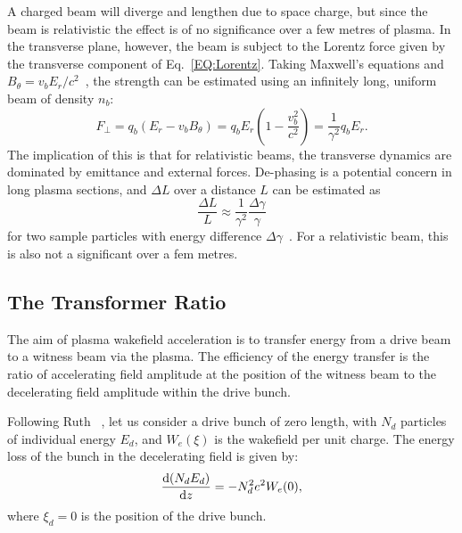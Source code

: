 A charged beam will diverge and lengthen due to space charge, but since the beam is relativistic the effect is of no significance over a few metres of plasma. In the transverse plane, however, the beam is subject to the Lorentz force given by the transverse component of Eq.~\ref{EQ:Lorentz}. Taking Maxwell's equations and $B_{\theta} = v_{b}E_{r}/c^{2}$~\cite{schindl:1999}, the strength can be estimated using an infinitely long, uniform beam of density $n_{b}$:
\begin{equation}
    F_{\perp} = q_{b}(E_{r} - v_{b}B_{\theta})
              = q_{b}E_{r}\left(1 - \frac{v_{b}^{2}}{c^{2}}\right)
              = \frac{1}{\gamma^2}q_{b}E_{r}. \label{EQ:DeFocR}
\end{equation}
The implication of this is that for relativistic beams, the transverse dynamics are dominated by emittance and external forces. De-phasing is a potential concern in long plasma sections, and $\Delta L$ over a distance $L$ can be estimated as
\begin{equation}
    \frac{\Delta L}{L} \approx \frac{1}{\gamma^{2}}\frac{\Delta\gamma}{\gamma} \label{EQ:DePhL}
\end{equation}
for two sample particles with energy difference $\Delta\gamma$~\cite{muggli:2017}. For a relativistic beam, this is also not a significant over a fem metres.

\subsection{The Transformer Ratio}
\label{Int:BPI:TRat}

The aim of plasma wakefield acceleration is to transfer energy from a drive beam to a witness beam via the plasma. The efficiency of the energy transfer is the ratio of accelerating field amplitude at the position of the witness beam to the decelerating field amplitude within the drive bunch.

Following Ruth \etal~\cite{ruth:1985}, let us consider a drive bunch of zero length, with $N_{d}$ particles of individual energy $E_{d}$, and $W_{e}(\xi)$ is the wakefield per unit charge. The energy loss of the bunch in the decelerating field is given by:
\begin{equation}
    \frac{\mathrm{d} (N_{d}E_{d})}{\mathrm{d} z} = - N_{d}^{2}e^{2}W_{e}(0), \label{EQ:TRat:Drive}
\end{equation}
where $\xi_{d} = 0$ is the position of the drive bunch.


